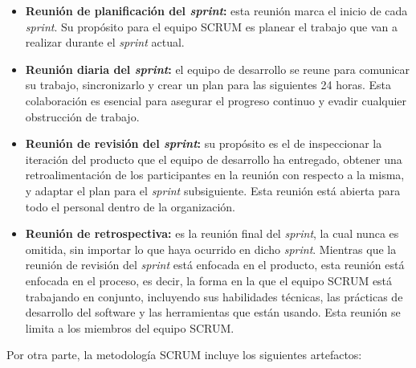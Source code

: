 			\begin{itemize}
				\item \textbf{Reuni\'{o}n de planificaci\'{o}n del \textit{sprint}: }
				esta reuni\'{o}n marca el inicio de cada \textit{sprint}. Su prop\'{o}sito para el equipo SCRUM es planear el trabajo que van a realizar durante el \textit{sprint} actual.
				
				\item \textbf{Reuni\'{o}n diaria del \textit{sprint}: }
				el equipo de desarrollo se reune para comunicar su trabajo, sincronizarlo y crear un plan para las siguientes 24 horas. Esta colaboraci\'{o}n es esencial para asegurar el progreso continuo y evadir cualquier obstrucci\'{o}n de trabajo.
				
				\item \textbf{Reuni\'{o}n de revisi\'{o}n del \textit{sprint}: }
				su prop\'{o}sito es el de inspeccionar la iteraci\'{o}n del producto que el equipo de desarrollo ha entregado, obtener una retroalimentaci\'{o}n de los participantes en la reuni\'{o}n con respecto a la misma, y adaptar el plan para el \textit{sprint} subsiguiente. Esta reuni\'{o}n est\'{a} abierta para todo el personal dentro de la organizaci\'{o}n.
				
				\item \textbf{Reuni\'{o}n de retrospectiva: }
				es la reuni\'{o}n final del \textit{sprint}, la cual nunca es omitida, sin importar lo que haya ocurrido en dicho \textit{sprint}. Mientras que la reuni\'{o}n de revisi\'{o}n del \textit{sprint} est\'{a} enfocada en el producto, esta reuni\'{o}n est\'{a} enfocada en el proceso, es decir, la forma en la que el equipo SCRUM est\'{a} trabajando en conjunto, incluyendo sus habilidades t\'{e}cnicas, las pr\'{a}cticas de desarrollo del software y las herramientas que est\'{a}n usando. Esta reuni\'{o}n se limita a los miembros del equipo SCRUM.
				
			\end{itemize}
			
Por otra parte, la metodolog\'{i}a SCRUM incluye los siguientes artefactos:
			
